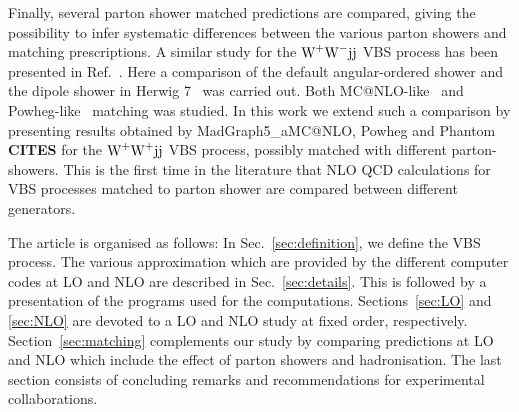 Finally, several parton shower matched predictions are compared, giving the possibility to infer systematic differences between the various parton showers and matching prescriptions.
A similar study for the $\text{W}^+ \text{W}^- \text{j} \text{j}$ VBS process has been presented in
Ref.~\cite{Rauch:2016upa}. Here a comparison of the default angular-ordered shower and the dipole
shower  in {\sc Herwig 7}~\cite{Bellm:2015jjp} was carried out. Both {\sc MC@NLO}-like~\cite{Frixione:2002ik} and {\sc Powheg}-like~\cite{Nason:2004rx,Frixione:2007vw} matching was studied. In this work we extend such a comparison by presenting 
results obtained by {\sc MadGraph5\_aMC@NLO}, {\sc Powheg} and {\sc Phantom} {\bf CITES} for the $\text{W}^+ \text{W}^+ \text{j} \text{j}$ VBS process, possibly matched with different parton-showers.
This is the first time in the literature that NLO QCD calculations for VBS processes matched to parton shower are compared between different generators. 

The article is organised as follows:
In Sec.~\ref{sec:definition}, we define the VBS process.
The various approximation which are provided by the different computer codes at LO and NLO are described in Sec.~\ref{sec:details}.
This is followed by a presentation of the programs used for the computations.
Sections~\ref{sec:LO} and \ref{sec:NLO} are devoted to a LO and NLO study at fixed order, respectively.
Section~\ref{sec:matching} complements our study by comparing predictions at LO and NLO which include the effect of parton showers and hadronisation.
The last section consists of concluding remarks and recommendations for experimental collaborations.
\fi
